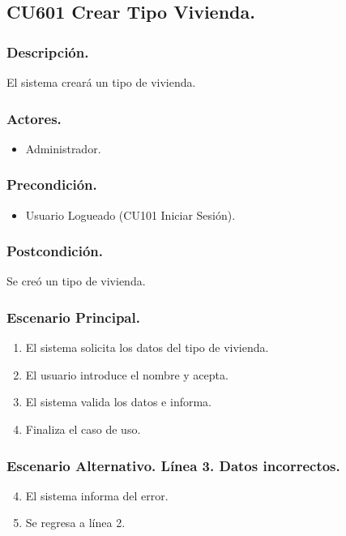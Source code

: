 \subsection{CU601 Crear Tipo Vivienda.}
\subsubsection{Descripci\'{o}n.}
El sistema crear\'{a} un tipo de vivienda.
\subsubsection{Actores.}
\begin{itemize}
\item Administrador.
\end{itemize}
\subsubsection{Precondici\'{o}n.}
\begin{itemize}
\item Usuario Logueado (CU101 Iniciar Sesi\'{o}n).
\end{itemize}
\subsubsection{Postcondici\'{o}n.}
Se cre\'{o} un tipo de vivienda.
\subsubsection{Escenario Principal.}
\begin{enumerate}
\item El sistema solicita los datos del tipo de vivienda.
\item El usuario introduce el nombre y acepta.
\item El sistema valida los datos e informa.
\item Finaliza el caso de uso.
\end{enumerate}
\subsubsection{Escenario Alternativo. L\'{i}nea 3. Datos incorrectos.}
\begin{enumerate}
\setcounter{enumi}{3}
\item El sistema informa del error.
\item Se regresa a l\'{i}nea 2.
\end{enumerate}

